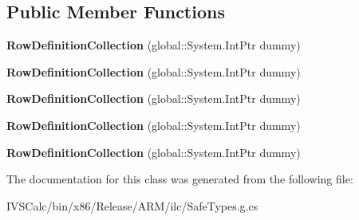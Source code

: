 \subsection*{Public Member Functions}
\begin{DoxyCompactItemize}
\item 
\mbox{\label{class_windows_1_1_u_i_1_1_xaml_1_1_controls_1_1_row_definition_collection_a0a71a48e44d5bcf56ba7d338fcb27154}} 
{\bfseries Row\+Definition\+Collection} (global\+::\+System.\+Int\+Ptr dummy)
\item 
\mbox{\label{class_windows_1_1_u_i_1_1_xaml_1_1_controls_1_1_row_definition_collection_a0a71a48e44d5bcf56ba7d338fcb27154}} 
{\bfseries Row\+Definition\+Collection} (global\+::\+System.\+Int\+Ptr dummy)
\item 
\mbox{\label{class_windows_1_1_u_i_1_1_xaml_1_1_controls_1_1_row_definition_collection_a0a71a48e44d5bcf56ba7d338fcb27154}} 
{\bfseries Row\+Definition\+Collection} (global\+::\+System.\+Int\+Ptr dummy)
\item 
\mbox{\label{class_windows_1_1_u_i_1_1_xaml_1_1_controls_1_1_row_definition_collection_a0a71a48e44d5bcf56ba7d338fcb27154}} 
{\bfseries Row\+Definition\+Collection} (global\+::\+System.\+Int\+Ptr dummy)
\item 
\mbox{\label{class_windows_1_1_u_i_1_1_xaml_1_1_controls_1_1_row_definition_collection_a0a71a48e44d5bcf56ba7d338fcb27154}} 
{\bfseries Row\+Definition\+Collection} (global\+::\+System.\+Int\+Ptr dummy)
\end{DoxyCompactItemize}


The documentation for this class was generated from the following file\+:\begin{DoxyCompactItemize}
\item 
I\+V\+S\+Calc/bin/x86/\+Release/\+A\+R\+M/ilc/Safe\+Types.\+g.\+cs\end{DoxyCompactItemize}
